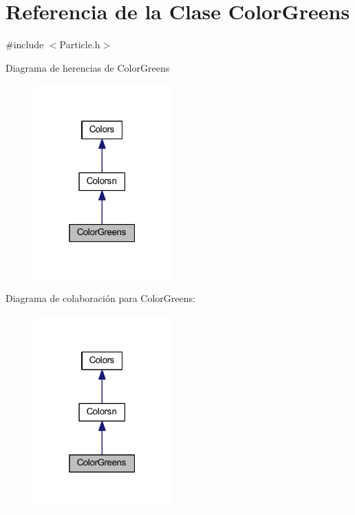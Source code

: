 \hypertarget{class_color_greens}{}\section{Referencia de la Clase Color\+Greens}
\label{class_color_greens}


{\ttfamily \#include $<$Particle.\+h$>$}



Diagrama de herencias de Color\+Greens
\nopagebreak
\begin{figure}[H]
\begin{center}
\leavevmode
\includegraphics[width=151pt]{class_color_greens__inherit__graph}
\end{center}
\end{figure}


Diagrama de colaboración para Color\+Greens\+:
\nopagebreak
\begin{figure}[H]
\begin{center}
\leavevmode
\includegraphics[width=151pt]{class_color_greens__coll__graph}
\end{center}
\end{figure}
